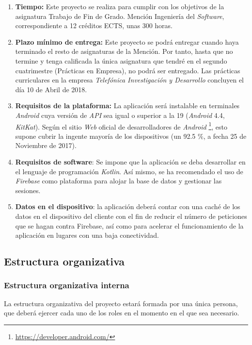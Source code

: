 \documentclass[twoside]{report}
\begin{document}
\begin{enumerate}
\item \textbf{Tiempo:} Este proyecto se realiza para cumplir con los objetivos de la asignatura Trabajo de Fin de Grado. Mención Ingeniería del \textit{Software}, correspondiente a 12 créditos ECTS, unas 300 horas.

\item \textbf{Plazo mínimo de entrega:} Este proyecto se podrá entregar cuando haya terminado el resto de asignaturas de la Mención. Por tanto, hasta que no termine y tenga calificada la única asignatura que tendré en el segundo cuatrimestre (Prácticas en Empresa), no podrá ser entregado. Las prácticas curriculares en la empresa \textit{Telefónica Investigación y Desarrollo} concluyen el día 10 de Abril de 2018.

\item \textbf{Requisitos de la plataforma:} La aplicación será instalable en terminales \textit{Android} cuya versión de \textit{API} sea igual o superior a la 19 (\textit{Android }4.4, \textit{KitKat}). Según el sitio \textit{Web} oficial de desarrolladores de \textit{Android} \footnote{\url{https://developer.android.com/}}, esto supone cubrir la ingente mayoría de los dispositivos (un 92.5 \%, a fecha 25 de Noviembre de 2017)\cite{androidversiondist}.

\item \textbf{Requisitos de software}: Se impone que la aplicación se deba desarrollar en el lenguaje de programación \textit{Kotlin}. Así mismo, se ha recomendado el uso de \textit{Firebase} como plataforma para alojar la base de datos y gestionar las sesiones.

\item \textbf{Datos en el dispositivo}: la aplicación deberá contar con una caché de los datos en el dispositivo del cliente con el fin de reducir el número de peticiones que se hagan contra Firebase, así como para acelerar el funcionamiento de la aplicación en lugares con una baja conectividad.
\end{enumerate}

\subsection{Estructura organizativa}
\subsubsection{Estructura organizativa interna}
La estructura organizativa del proyecto estará formada por una única persona, que deberá ejercer cada uno de los roles en el momento en el que sea necesario. \cite{upedu} \vspace{0.5cm}
\end{document}
